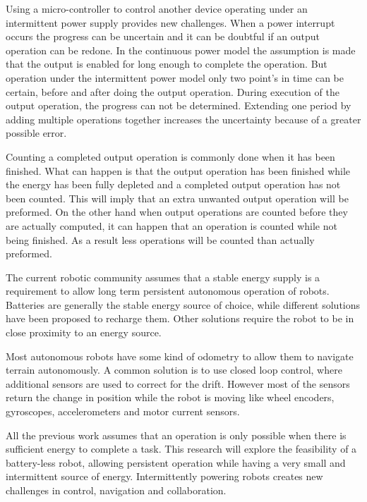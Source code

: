 \documentclass[letterpaper, 10 pt, conference]{ieeeconf}  %
\begin{document}
Using a micro-controller to control another device operating under an intermittent power supply provides new challenges.
When a power interrupt occurs the progress can be uncertain and it can be doubtful if an output operation can be redone.
In the continuous power model the assumption is made that the output is enabled for long enough to complete the operation.
But operation under the intermittent power model only two point's in time can be certain, before and after doing the output operation.
During execution of the output operation, the progress can not be determined. %
Extending one period by adding multiple operations together increases the uncertainty because of a greater possible error.

Counting a completed output operation is commonly done when it has been finished.
What can happen is that the output operation has been finished while the energy has been fully depleted and a completed output operation has not been counted.
This will imply that an extra unwanted output operation will be preformed.
On the other hand when output operations are counted before they are actually computed, it can happen that an operation is counted while not being finished.
As a result less operations will be counted than actually preformed.



The current robotic community assumes that a stable energy supply is a requirement to allow long term persistent autonomous operation of robots.
Batteries are generally the stable energy source of choice, while different solutions have been proposed to recharge them.
Other solutions require the robot to be in close proximity to an energy source.


Most autonomous robots have some kind of odometry to allow them to navigate terrain autonomously.
A common solution is to use closed loop control, where additional sensors are used to correct for the drift.
However most of the sensors return the change in position while the robot is moving like wheel encoders, gyroscopes, accelerometers and motor current sensors.

% 
All the previous work assumes that an operation is only possible when there is sufficient energy to complete a task.
This research will explore the feasibility of a battery-less robot, allowing persistent operation while having a very small and intermittent source of energy.
Intermittently powering robots creates new challenges in control, navigation and collaboration.
\end{document}

